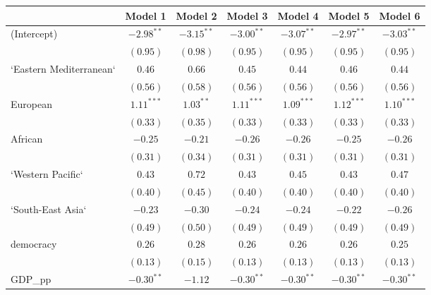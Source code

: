 
\begin{table}[!h]
\begin{center}
\begin{tabular}{l c c c c c c }
\toprule
 & Model 1 & Model 2 & Model 3 & Model 4 & Model 5 & Model 6 \\
\midrule
(Intercept)             & $-2.98^{**}$ & $-3.15^{**}$ & $-3.00^{**}$ & $-3.07^{**}$ & $-2.97^{**}$ & $-3.03^{**}$ \\
                        & $(0.95)$     & $(0.98)$     & $(0.95)$     & $(0.95)$     & $(0.95)$     & $(0.95)$     \\
`Eastern Mediterranean` & $0.46$       & $0.66$       & $0.45$       & $0.44$       & $0.46$       & $0.44$       \\
                        & $(0.56)$     & $(0.58)$     & $(0.56)$     & $(0.56)$     & $(0.56)$     & $(0.56)$     \\
European                & $1.11^{***}$ & $1.03^{**}$  & $1.11^{***}$ & $1.09^{***}$ & $1.12^{***}$ & $1.10^{***}$ \\
                        & $(0.33)$     & $(0.35)$     & $(0.33)$     & $(0.33)$     & $(0.33)$     & $(0.33)$     \\
African                 & $-0.25$      & $-0.21$      & $-0.26$      & $-0.26$      & $-0.25$      & $-0.26$      \\
                        & $(0.31)$     & $(0.34)$     & $(0.31)$     & $(0.31)$     & $(0.31)$     & $(0.31)$     \\
`Western Pacific`       & $0.43$       & $0.72$       & $0.43$       & $0.45$       & $0.43$       & $0.47$       \\
                        & $(0.40)$     & $(0.45)$     & $(0.40)$     & $(0.40)$     & $(0.40)$     & $(0.40)$     \\
`South-East Asia`       & $-0.23$      & $-0.30$      & $-0.24$      & $-0.24$      & $-0.22$      & $-0.26$      \\
                        & $(0.49)$     & $(0.50)$     & $(0.49)$     & $(0.49)$     & $(0.49)$     & $(0.49)$     \\
democracy               & $0.26$       & $0.28$       & $0.26$       & $0.26$       & $0.26$       & $0.25$       \\
                        & $(0.13)$     & $(0.15)$     & $(0.13)$     & $(0.13)$     & $(0.13)$     & $(0.13)$     \\
GDP\_pp                 & $-0.30^{**}$ & $-1.12$      & $-0.30^{**}$ & $-0.30^{**}$ & $-0.30^{**}$ & $-0.30^{**}$ \\

\end{tabular}
\end{center}
\end{table}
